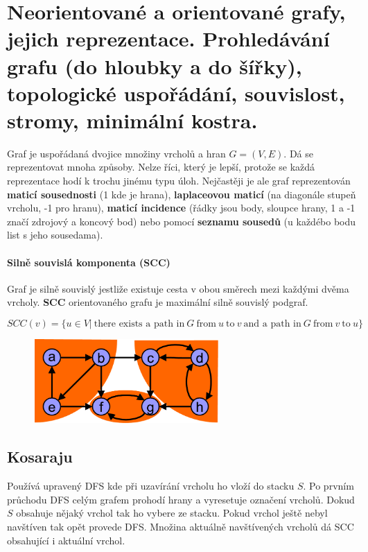 \section[PAL - Grafy - refrezentace a algoritmy]{Neorientované a orientované grafy, jejich reprezentace. Prohledávání grafu (do hloubky a do šířky), topologické uspořádání, souvislost, stromy, minimální kostra.}
Graf je uspořádaná dvojice množiny vrcholů a hran $G = (V,E)$. Dá se reprezentovat mnoha způsoby. Nelze říci, který je lepší, protože se každá reprezentace hodí k trochu jinému typu úloh. Nejčastěji je ale graf reprezentován \textbf{maticí sousednosti} (1 kde je hrana), \textbf{laplaceovou maticí} (na diagonále stupeň vrcholu, -1 pro hranu), \textbf{maticí incidence} (řádky jsou body, sloupce hrany, 1 a -1 značí zdrojový a koncový bod) nebo pomocí \textbf{seznamu sousedů} (u každébo bodu list s jeho sousedama).

\paragraph{Silně souvislá komponenta (SCC)}
Graf je silně souvislý jestliže existuje cesta v obou směrech mezi každými dvěma vrcholy. \textbf{SCC} orientovaného grafu je maximální silně souvislý podgraf.

    $$SCC(v) = \{u \in V |~\text{there exists a path in}~G~\text{from}~u~\text{to}~v~\text{and a path in}~G~\text{from}~v~\text{to}~u\}$$
    
\begin{figure}[h]
    \begin{center}
        \includegraphics[width=70mm]{spolecne/02/images/scc}
    \end{center}
\end{figure}

\subsection{Kosaraju}
Používá upravený DFS kde při uzavírání vrcholu ho vloží do stacku $S$. Po prvním průchodu DFS celým grafem prohodí hrany a vyresetuje označení vrcholů. Dokud $S$ obsahuje nějaký vrchol tak ho vybere ze stacku. Pokud vrchol ještě nebyl navštíven tak opět provede DFS. Množina aktuálně navštívených vrcholů dá SCC obsahující i aktuální vrchol.

